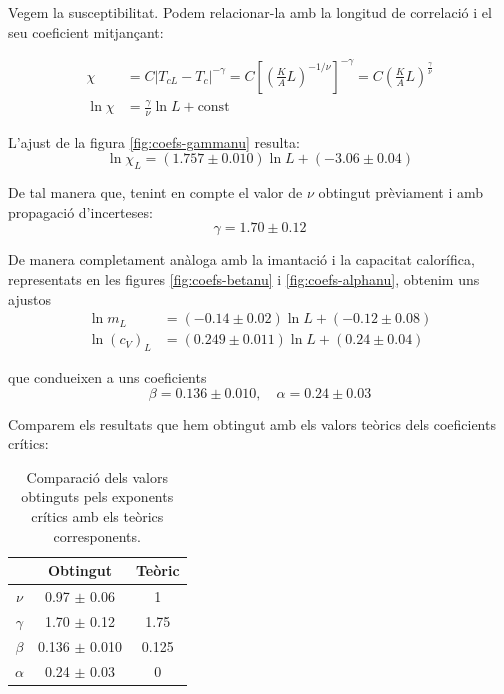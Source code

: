 \documentclass[a4paper]{article}
\begin{document}
Vegem la susceptibilitat. Podem relacionar-la amb la longitud de correlació i el seu coeficient mitjançant:

\begin{align*}
	\chi &= C \left|T_{cL}-T_c\right|^{-\gamma} = C \left[ \left(\frac{K}{A} L \right)^{-1/\nu} \right]^{-\gamma} = C \left(\frac{K}{A} L \right)^{\frac{\gamma}{\nu}} \\
	\ln \chi &= \frac{\gamma}{\nu} \ln L + \text{const}
\end{align*}

L'ajust de la figura \ref{fig:coefs-gammanu} resulta:
\begin{equation*}
	\ln \chi_L = (1.757 \pm 0.010) \ln L + (-3.06 \pm 0.04)
\end{equation*}

De tal manera que, tenint en compte el valor de $\nu$ obtingut prèviament i amb propagació d'incerteses:
\begin{equation*}
	\gamma = 1.70 \pm 0.12
\end{equation*}

De manera completament anàloga amb la imantació i la capacitat calorífica, representats en les figures \ref{fig:coefs-betanu} i \ref{fig:coefs-alphanu}, obtenim uns ajustos
\begin{align*}
	\ln m_L &= (-0.14 \pm 0.02) \ln L + (-0.12 \pm 0.08) \\
	\ln ({c_V})_L &= (0.249 \pm 0.011) \ln L + (0.24 \pm 0.04)
\end{align*}

que condueixen a uns coeficients
\begin{equation*}
	\beta = 0.136 \pm 0.010, \quad \alpha = 0.24 \pm 0.03
\end{equation*}

Comparem els resultats que hem obtingut amb els valors teòrics dels coeficients crítics:
\begin{table}[H]
\centering
\begin{tabular}{ccc}
\hline
\textbf{} & \textbf{Obtingut} & \textbf{Teòric} \\ \hline
$\nu$ & 0.97 $\pm$ 0.06 & 1 \\
$\gamma$ & 1.70 $\pm$ 0.12 & 1.75 \\
$\beta$ & 0.136 $\pm$ 0.010 & 0.125 \\
$\alpha$ & 0.24 $\pm$ 0.03 & 0
\end{tabular}
\caption{Comparació dels valors obtinguts pels exponents crítics amb els teòrics corresponents.}
\label{tab:critexp}
\end{table}
\end{document}
